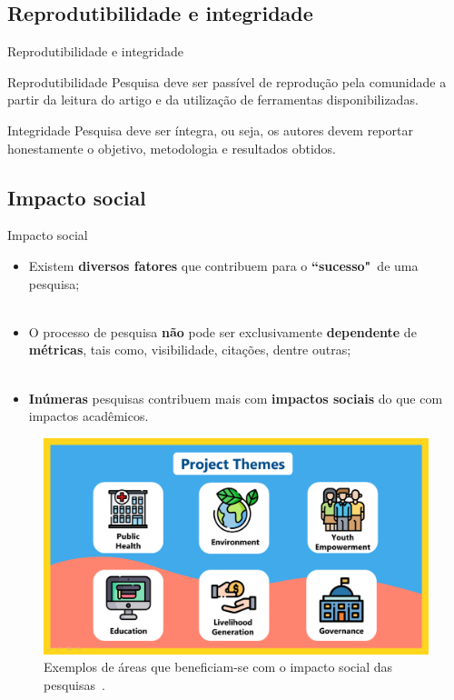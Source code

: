 \subsection{Reprodutibilidade e integridade}
\label{ss.reproducibility_integrity}

\begin{frame}{Reprodutibilidade e integridade}
	\begin{block}{\centering Reprodutibilidade}
		Pesquisa deve ser passível de reprodução pela comunidade a partir da leitura do artigo e da utilização de ferramentas disponibilizadas.
	\end{block}
	\vspace{1cm}
	\begin{block}{\centering Integridade}
		Pesquisa deve ser íntegra, ou seja, os autores devem reportar honestamente o objetivo, metodologia e resultados obtidos.
	\end{block}
\end{frame}

\subsection{Impacto social}
\label{ss.social_impact}

\begin{frame}{Impacto social}
	\justify 
	\begin{itemize}
		\item<1> Existem \textbf{diversos fatores} que contribuem para o \textbf{``sucesso"}~de uma pesquisa;
		\\~\\
		\item<2> O processo de pesquisa \textbf{não} pode ser exclusivamente \textbf{dependente} de \textbf{métricas}, tais como, visibilidade, citações, dentre outras;
		\\~\\
		\item<3> \textbf{Inúmeras} pesquisas contribuem mais com \textbf{impactos sociais} do que com impactos acadêmicos.
	\end{itemize}
\end{frame}

\begin{frame}{}
	\centering
	\begin{figure}
		\includegraphics[scale=0.2]{figs/social_impact_research.png}
		\caption{Exemplos de áreas que beneficiam-se com o impacto social das pesquisas~\cite{YLAC:21}.}
		\label{f.social_impact_research}
	\end{figure}
\end{frame}
